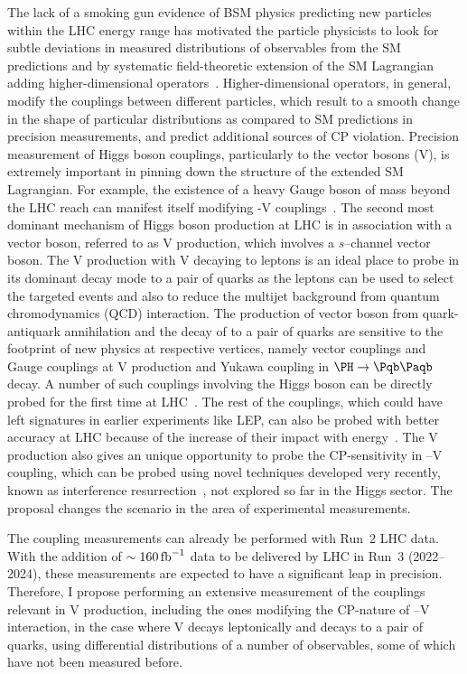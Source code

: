 \documentclass[a4paper,11pt]{article}
\newcommand{\Pb}{{{\Pqb}}\xspace}
\newcommand{\PAb}{{{{\Paqb}}}\xspace}
\renewcommand{\PV}{{{{V}}}\xspace}
\newcommand{\VH}{{{\PV}{\PH}}\xspace}
\begin{document}
The lack of a smoking gun evidence of BSM physics predicting new particles within the LHC energy range has motivated the particle physicists to look for subtle deviations in measured distributions of observables from the SM predictions and by systematic field-theoretic extension of the SM Lagrangian adding higher-dimensional operators~\cite{Grinstein:1991cd,Chiu:2007dg,Passarino:2016pzb}.
Higher-dimensional operators, in general, modify the couplings between different particles, which result to a smooth change in the shape of particular distributions as compared to SM predictions in precision measurements, and predict additional sources of CP violation. 
Precision measurement of Higgs boson couplings, particularly to the vector bosons (\PV), is extremely important in pinning down the structure of the extended SM Lagrangian. 
For example, the existence of a heavy Gauge boson of mass beyond the LHC reach can manifest itself modifying {\PH}-{\PV} couplings~\cite{Appelquist:1974tg}. 
The second most dominant mechanism of Higgs boson production at LHC is in association with a vector boson, referred to as \VH production, which involves a $s$--channel vector boson. 
The \VH production with \PV decaying to leptons is an ideal place to probe \PH in its dominant decay mode to a pair of \Pb quarks as the leptons can be used to select the targeted events and also to reduce the multijet background from quantum chromodynamics (QCD) interaction.
The production of vector boson from quark-antiquark annihilation and the decay of \PH to a pair of \Pb quarks are sensitive to the footprint of new physics at respective vertices, namely vector couplings and Gauge couplings at \VH production and Yukawa coupling in $\PH \to \Pb \PAb$ decay. 
A number of such couplings involving the Higgs boson can be directly probed for the first time at LHC~\cite{Gupta:2014rxa}.
The rest of the couplings, which could have left signatures in earlier experiments like LEP, can also be probed with better accuracy at LHC because of the increase of their impact with energy~\cite{Ellis:2014jta,Grojean:2018dqj}.
The \VH production also gives an unique opportunity to probe the CP-sensitivity in \PH--\PV coupling, 
which can be probed using novel techniques developed very recently, known as interference resurrection~\cite{}, 
not explored so far in the Higgs sector. 
The proposal changes the scenario in the area of experimental measurements.  

The coupling measurements can already be performed with Run~2 LHC data. With the addition of $\sim 160\mbox{\ensuremath{\,\text{fb}^{-1}}}$ data to be delivered by LHC in Run~3 (2022--2024), these measurements are expected to have a significant leap in precision.
Therefore, I propose performing an extensive measurement of the couplings relevant in \VH production, 
including the ones modifying the CP-nature of \PH--\PV interaction,
in the case where \PV decays leptonically and \PH decays to a pair of \Pb quarks, 
using differential distributions of a number of observables, some of which have not been measured before.
\end{document}
